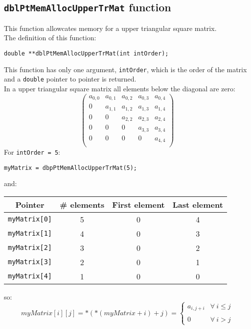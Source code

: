 \subsection{\texttt{dblPtMemAllocUpperTrMat} function} \label{sec:dblPtMemAllocUpperTrMat}

This function allowcates memory for a upper triangular square matrix.\\

The definition of this function:
%
\begin{verbatim}
double **dblPtMemAllocUpperTrMat(int intOrder);
\end{verbatim}

This function has only one argument, \texttt{intOrder}, which is the order of the matrix and a \texttt{double} pointer to pointer is returned.\\

In a upper triangular square matrix all elements below the diagonal are zero: 
%
\begin{displaymath}
\left( \begin{array}{ccccc}
  a_{0,0} & a_{0,1} & a_{0,2} & a_{0,3} & a_{0,4} \\
  0      & a_{1,1} & a_{1,2} & a_{1,3} & a_{1,4} \\ 
  0      & 0      & a_{2,2} & a_{2,3} & a_{2,4} \\
  0      & 0      & 0      & a_{3,3} & a_{3,4} \\
  0      & 0      & 0      & 0      & a_{4,4} \\
\end{array} \right)
\end{displaymath}
%
For \texttt{intOrder = 5}:
%
\begin{verbatim}
myMatrix = dbpPtMemAllocUpperTrMat(5);  
\end{verbatim}
%
and:
\begin{center}
  \begin{tabular}{|c|c|c|c|}
    \hline
    \textbf{Pointer} & \textbf{\# elements} & \textbf{First element} & \textbf{Last element}\\
    \hline
    \texttt{myMatrix[0]} & 5 & 0 & 4\\
    \hline
    \texttt{myMatrix[1]} & 4 & 0 & 3\\
    \hline
    \texttt{myMatrix[2]} & 3 & 0 & 2\\
    \hline
    \texttt{myMatrix[3]} & 2 & 0 & 1\\
    \hline
    \texttt{myMatrix[4]} & 1 & 0 & 0\\
    \hline
  \end{tabular}
\end{center}
%
so:
%
\begin{displaymath}
  myMatrix[i][j] = *(*(myMatrix + i) + j) = \left\{ \begin{array}{ll}
    a_{i,j+i} & \forall \ i \le j \\
     & \\
    0 & \forall \ i > j
    \end{array} \right.    
\end{displaymath}

